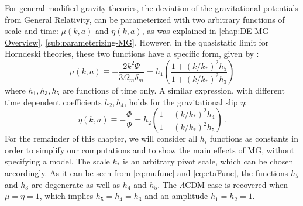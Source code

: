 For general modified gravity theories, the deviation
of the gravitational potentials from General Relativity,
can be parameterized with two arbitrary functions
of scale and time: $\mu(k,a)$ and $\eta(k,a)$,
as was explained in \cref{chap:DE-MG-Overview}, \cref{sub:parameterizing-MG}.
However, in the quasistatic limit for Horndeski theories, these two functions have a specific form, given by \cite{amendola_observables_2013-3, bellini_maximal_2014}: 
\begin{equation}
\mu(k,a)\equiv-\frac{2k^{2}\Psi}{3\Omega_{m}\delta_{m}}=h_{1}\left(\frac{1+(k/k_{*})^{2}h_{5}}{1+(k/k_{*})^{2}h_{3}}\right)\label{eq:mufunc}
\end{equation}
where $h_{1},h_{3},h_{5}$ are functions of time only. A similar expression,
with different time dependent coefficients $h_{2},h_{4}$, holds for
the gravitational slip $\eta$: 
\begin{equation}
\eta(k,a)\equiv-\frac{\Phi}{\Psi}=h_{2}\left(\frac{1+(k/k_{*})^{2}h_{4}}{1+(k/k_{*})^{2}h_{5}}\right)\,.\label{eq:etaFunc}
\end{equation}
For the remainder of this chapter, we will consider all $h_{i}$ functions as constants in order to simplify our computations and to show the main effects of MG, without specifying
a model. The scale $k_{*}$ is an arbitrary pivot scale, which can be chosen accordingly.
As it can be seen from  \cref{eq:mufunc} and \cref{eq:etaFunc},
the functions $h_{5}$ and $h_{3}$ are degenerate as well as $h_{4}$
and $h_{5}$. The $\Lambda\textrm{CDM}$ case is recovered when $\mu=\eta=1$, which
implies $h_{5}=h_{4}=h_{3}$ and an amplitude $h_{1}=h_{2}=1$.

